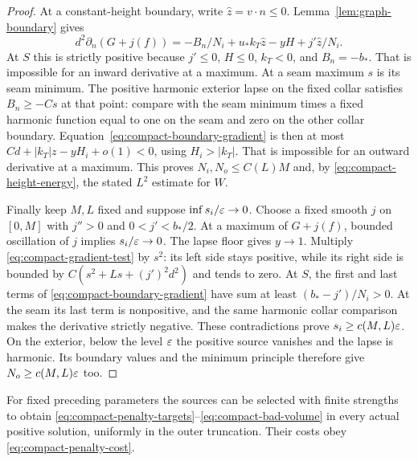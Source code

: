 \begin{proof}
At a constant-height boundary, write $\widehat z=v\cdot n\le0$.
Lemma~\ref{lem:graph-boundary} gives
\begin{equation}\label{eq:compact-boundary-gradient}
 d^2\partial_n(G+j(f))
 =-B_n/N_i+u_*k_T\widehat z-yH+j'\widehat z/N_i.
\end{equation}
At $S$ this is strictly positive because $j'\le0$, $H\le0$,
$k_T<0$, and $B_n=-b_*$. That is impossible for an inward derivative
at a maximum. At a seam maximum $s$ is its seam minimum. The positive
harmonic exterior lapse on the fixed collar satisfies
$B_n\ge-Cs$ at that point: compare with the seam minimum times a
fixed harmonic function equal to one on the seam and zero on the
other collar boundary. Equation~\eqref{eq:compact-boundary-gradient}
is then at most $Cd+|k_T|z-yH_i+o(1)<0$, using
$H_i>|k_T|$. That is impossible for an outward derivative at a maximum.
This proves $N_i,N_o\le C(L)M$ and, by
\eqref{eq:compact-height-energy}, the stated $L^2$ estimate for $W$.

Finally keep $M,L$ fixed and suppose $\inf s_i/\varepsilon\to0$.
Choose a fixed smooth $j$ on $[0,M]$ with $j''>0$ and
$0<j'<b_*/2$. At a maximum of $G+j(f)$, bounded oscillation of $j$
implies $s_i/\varepsilon\to0$. The lapse floor gives $y\to1$.
Multiply \eqref{eq:compact-gradient-test} by $s^2$: its left side
stays positive, while its right side is bounded by
$C(s^2+Ls+(j')^2d^2)$ and tends to zero. At $S$, the first and last
terms of \eqref{eq:compact-boundary-gradient} have sum at least
$(b_*-j')/N_i>0$. At the seam its last term is nonpositive, and the
same harmonic collar comparison makes the derivative strictly
negative. These contradictions prove $s_i\ge c(M,L)\varepsilon$.
On the exterior, below the level $\varepsilon$ the positive source vanishes
and the lapse is harmonic. Its boundary values and the minimum
principle therefore give $N_o\ge c(M,L)\varepsilon$ too.
\end{proof}

\begin{lemma}\label{lem:compact-penalties}
For fixed preceding parameters the sources can be selected with finite
strengths to obtain \eqref{eq:compact-penalty-targets}--\eqref{eq:compact-bad-volume}
in every actual positive solution, uniformly in the outer truncation.
Their costs obey \eqref{eq:compact-penalty-cost}.
\end{lemma}

